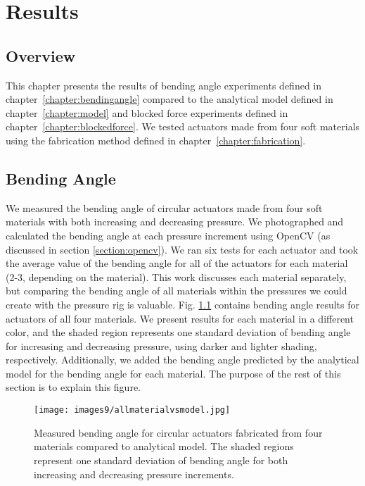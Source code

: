 \chapter{Results}
\section{Overview}
This chapter presents the results of bending angle experiments defined in chapter~\ref{chapter:bendingangle} compared to the analytical model defined in chapter~\ref{chapter:model} and blocked force experiments defined in chapter~\ref{chapter:blockedforce}. We tested actuators made from four soft materials using the fabrication method defined in chapter~\ref{chapter:fabrication}.

\section{Bending Angle}

We measured the bending angle of circular actuators made from four soft materials with both increasing and decreasing pressure. We photographed and calculated the bending angle at each pressure increment using OpenCV (as discussed in section \ref{section:opencv}). We ran six tests for each actuator and took the average value of the bending angle for all of the actuators for each material (2-3, depending on the material). This work discusses each material separately, but comparing the bending angle of all materials within the pressures we could create with the pressure rig is valuable. Fig. \ref{fig:allmaterialvsmodel} contains bending angle results for actuators of all four materials. We present results for each material in a different color, and the shaded region represents one standard deviation of bending angle for increasing and decreasing pressure, using darker and lighter shading, respectively. Additionally, we added the bending angle predicted by the analytical model for the bending angle for each material. The purpose of the rest of this section is to explain this figure. 

\begin{figure}[ht]
    \centering
     \texttt{[image: images9/allmaterialvsmodel.jpg]}
    \caption{Measured bending angle for circular actuators fabricated from four materials compared to analytical model. The shaded regions represent one standard deviation of bending angle for both increasing and decreasing pressure increments.}
    \label{fig:allmaterialvsmodel}
\end{figure}

